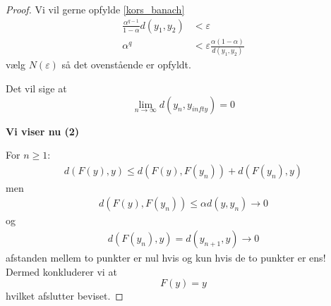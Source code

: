 \begin{proof}
  Vi vil gerne opfylde \eqref{kors_banach}
  \begin{align*}
    \frac{\alpha^{q - 1}}{1 - \alpha}d(y_1, y_2) &< \varepsilon \\
    \alpha^{q} &< \varepsilon \frac{\alpha(1 - \alpha)}{d(y_1, y_2)}
  \end{align*}
  vælg $N(\varepsilon)$ så det ovenstående er opfyldt.

  Det vil sige at $$ \lim_{n \rightarrow \infty} d(y_n, y_{infty}) = 0 $$

  \textbf{Vi viser nu (2)}

  For $n \geq 1$:
  \begin{align*}
    d(F(y), y) \leq d(F(y), F(y_n)) + d(F(y_n), y)
  \end{align*}
  men
  \begin{align*}
    d(F(y), F(y_n)) \leq \alpha d(y, y_n) \rightarrow 0
  \end{align*}
  og
  \begin{align*}
    d(F(y_n), y) = d(y_{n + 1}, y) \rightarrow 0
  \end{align*}
  afstanden mellem to punkter er nul hvis og kun hvis de to punkter er ens! Dermed konkluderer vi at
  $$ F(y) = y$$
  hvilket afslutter beviset.
\end{proof}
